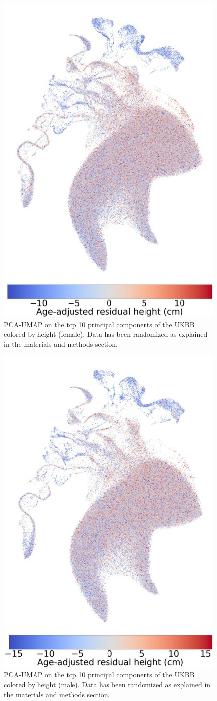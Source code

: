 \documentclass[12pt]{pnas-new}
\begin{document}
\begin{figure}
    \centering
    \includegraphics[width=0.4\columnwidth]{images/UKBB_UMAP_PC10_NN15_MD05_2018328174511_2018714161841_Height_res_pct1_f.pdf}
    \caption{PCA-UMAP on the top 10 principal components of the UKBB colored by height (female). Data has been randomized as explained in the materials and methods section.}
    \label{fig:supp_ukbb_height_f}
\end{figure}

\begin{figure}
    \centering
    \includegraphics[width=0.4\columnwidth]{images/UKBB_UMAP_PC10_NN15_MD05_2018328174511_2018714161841_Height_res_pct1_m.pdf}
    \caption{PCA-UMAP on the top 10 principal components of the UKBB colored by height (male). Data has been randomized as explained in the materials and methods section.}
    \label{fig:supp_ukbb_height_m}
\end{figure}
\end{document}
